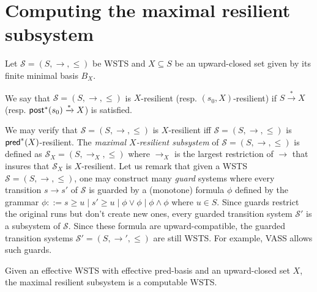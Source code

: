 \section{Computing the maximal resilient subsystem}

Let $\mathscr{S}=(S, \rightarrow, \leq)$ be WSTS and $X \subseteq S$ be an upward-closed set given by its finite minimal basis $B_X$. 

\begin{definition}
We say that $\mathscr{S}=(S, \rightarrow, \leq)$ is $X$-resilient (resp. $(s_0,X)$-resilient) if $S  \xrightarrow{*} X$ (resp. $\textsf{post}^*(s_0) \xrightarrow{*} X$) is satisfied.  
\end{definition}

We may verify that  $\mathscr{S}=(S, \rightarrow, \leq)$ is $X$-resilient iff  $\mathscr{S}=(S, \rightarrow, \leq)$ is $\textsf{pred}^*(X)$-resilient. The \emph{maximal $X$-resilient subsystem} of $\mathscr{S}=(S,\rightarrow,\leq)$ is defined as $\mathscr{S}_X=(S,\rightarrow_X,\leq)$ where $\rightarrow_X$ is the largest restriction of $\rightarrow$ that insures that $\mathscr{S}_X$ is $X$-resilient.
Let us remark that given a WSTS $\mathscr{S}=(S, \rightarrow, \leq)$, one may construct many \emph{guard} systems where every transition $s \rightarrow s'$ of $\mathscr{S}$ is guarded by a (monotone) formula $\phi$ defined by the grammar $\phi ::= s \geq u \mid s' \geq u \mid \phi \vee \phi \mid \phi \wedge \phi$ where $u \in S$. Since guards restrict the original runs but don't create new ones, every guarded transition system $\mathscr{S'}$ is a subsystem of $\mathscr{S}$. Since these formula are upward-compatible, the guarded transition systems $\mathscr{S'}=(S, \rightarrow', \leq)$ are still WSTS.
%
For example, VASS allows such guards.

\begin{theorem}{}
Given an effective WSTS with effective pred-basis and an upward-closed set $X$, the maximal resilient subsystem is a computable WSTS.
\end{theorem}

